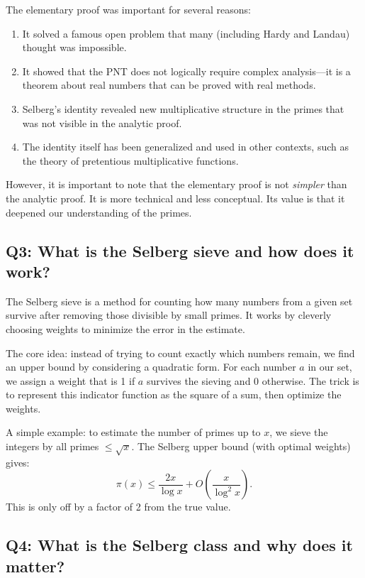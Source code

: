 The elementary proof was important for several reasons:
\begin{enumerate}
    \item It solved a famous open problem that many (including Hardy and Landau) thought was impossible.
    \item It showed that the PNT does not logically require complex analysis---it is a theorem about real numbers that can be proved with real methods.
    \item Selberg's identity revealed new multiplicative structure in the primes that was not visible in the analytic proof.
    \item The identity itself has been generalized and used in other contexts, such as the theory of pretentious multiplicative functions.
\end{enumerate}

However, it is important to note that the elementary proof is not \emph{simpler} than the analytic proof. It is more technical and less conceptual. Its value is that it deepened our understanding of the primes.

\subsection*{Q3: What is the Selberg sieve and how does it work?}

The Selberg sieve is a method for counting how many numbers from a given set survive after removing those divisible by small primes. It works by cleverly choosing weights to minimize the error in the estimate.

The core idea: instead of trying to count exactly which numbers remain, we find an upper bound by considering a quadratic form. For each number \(a\) in our set, we assign a weight that is 1 if \(a\) survives the sieving and 0 otherwise. The trick is to represent this indicator function as the square of a sum, then optimize the weights.

A simple example: to estimate the number of primes up to \(x\), we sieve the integers by all primes \(\leq \sqrt{x}\). The Selberg upper bound (with optimal weights) gives:
\[
\pi(x) \leq \frac{2x}{\log x} + O\!\left(\frac{x}{\log^2 x}\right).
\]
This is only off by a factor of 2 from the true value.

\subsection*{Q4: What is the Selberg class and why does it matter?}

